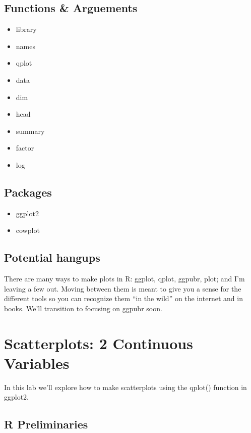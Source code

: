 \documentclass[]{book}
\providecommand{\tightlist}{%
  \setlength{\itemsep}{0pt}\setlength{\parskip}{0pt}}
\theoremstyle{definition}
\theoremstyle{definition}
\theoremstyle{definition}
\theoremstyle{remark}
\begin{document}
\subsection*{Functions \& Arguements}\label{functions-arguements-5}

\begin{itemize}
\tightlist
\item
  library
\item
  names
\item
  qplot
\item
  data
\item
  dim
\item
  head
\item
  summary
\item
  factor
\item
  log
\end{itemize}

\subsection*{Packages}\label{packages-6}

\begin{itemize}
\tightlist
\item
  ggplot2
\item
  cowplot
\end{itemize}

\subsection*{Potential hangups}\label{potential-hangups-4}

There are many ways to make plots in R: ggplot, qplot, ggpubr, plot; and
I'm leaving a few out. Moving between them is meant to give you a sense
for the different tools so you can recognize them ``in the wild'' on the
internet and in books. We'll transition to focusing on ggpubr soon.

\section{Scatterplots: 2 Continuous
Variables}\label{scatterplots-2-continuous-variables}

In this lab we'll explore how to make scatterplots using the qplot()
function in ggplot2.

\subsection{R Preliminaries}\label{r-preliminaries}
\end{document}
